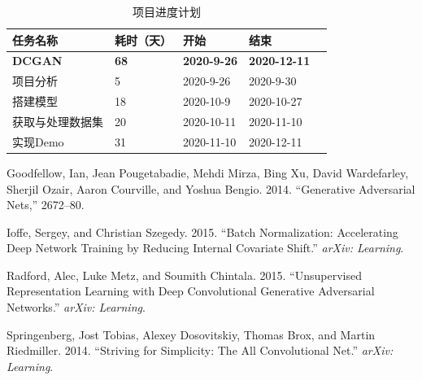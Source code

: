 \documentclass[hyperref, a4paper]{ctexart}
\begin{document}
\begin{table}
    \caption{项目进度计划}
    \centering
    \begin{tabular}{|p{2.0cm}<{\centering}|p{1.0cm}<{\centering}|p{2.0cm}<{\centering}|p{2.0cm}<{\centering}|p{2.0cm}<{\centering}|}
    \hline
    任务名称     & 耗时（天） & 开始         & 结束         \\ \hline
    \textbf{DCGAN}    & \textbf{68}    & \textbf{2020-9-26}  & \textbf{2020-12-11} \\ \hline
    项目分析     & 5     & 2020-9-26  & 2020-9-30  \\ \hline
    搭建模型     & 18     & 2020-10-9  & 2020-10-27 \\ \hline
    获取与处理数据集 & 20     & 2020-10-11 & 2020-11-10 \\ \hline
    实现Demo   & 31    & 2020-11-10 & 2020-12-11 \\ \hline
    \end{tabular}
\end{table}

\hypertarget{refs}{}
\leavevmode\hypertarget{ref-goodfellow2014generative}{}%
Goodfellow, Ian, Jean Pougetabadie, Mehdi Mirza, Bing Xu, David
Wardefarley, Sherjil Ozair, Aaron Courville, and Yoshua Bengio. 2014.
``Generative Adversarial Nets,'' 2672--80.

\leavevmode\hypertarget{ref-ioffe2015batch}{}%
Ioffe, Sergey, and Christian Szegedy. 2015. ``Batch Normalization:
Accelerating Deep Network Training by Reducing Internal Covariate
Shift.'' \emph{arXiv: Learning}.

\leavevmode\hypertarget{ref-radford2015unsupervised}{}%
Radford, Alec, Luke Metz, and Soumith Chintala. 2015. ``Unsupervised
Representation Learning with Deep Convolutional Generative Adversarial
Networks.'' \emph{arXiv: Learning}.

\leavevmode\hypertarget{ref-springenberg2014striving}{}%
Springenberg, Jost Tobias, Alexey Dosovitskiy, Thomas Brox, and Martin
Riedmiller. 2014. ``Striving for Simplicity: The All Convolutional
Net.'' \emph{arXiv: Learning}.
\end{document}
